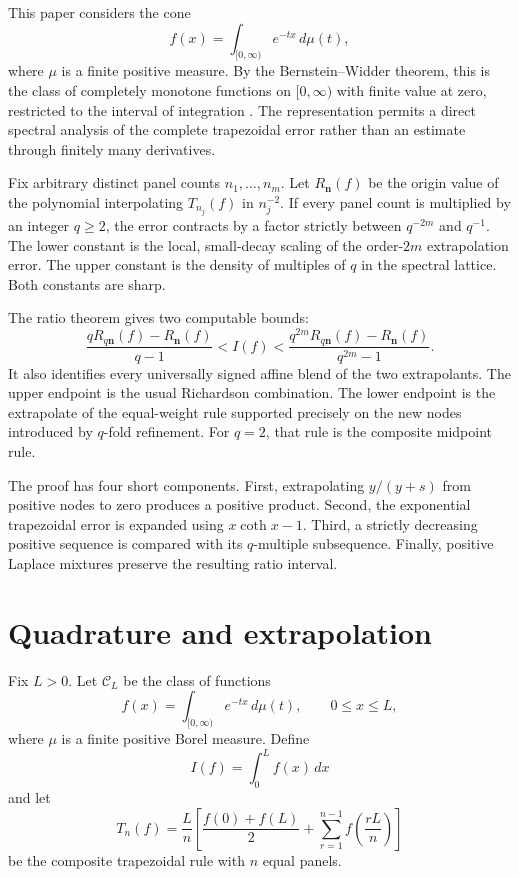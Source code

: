 \documentclass[11pt]{article}
\theoremstyle{definition}
\theoremstyle{remark}
\newcommand{\cC}{\mathcal{C}}
\newcommand{\bN}{\boldsymbol{n}}
\newcommand{\1}{\mathbf{1}}
\begin{document}
This paper considers the cone
\[
f(x)=\int_{[0,\infty)}e^{-tx}\,d\mu(t),
\]
where \(\mu\) is a finite positive measure. By the Bernstein--Widder theorem,
this is the class of completely monotone functions on \([0,\infty)\) with
finite value at zero, restricted to the interval of integration
\cite{Widder,SchillingSongVondracek}. The representation permits a direct
spectral analysis of the complete trapezoidal error rather than an estimate
through finitely many derivatives.

Fix arbitrary distinct panel counts \(n_1,\ldots,n_m\). Let \(R_{\bN}(f)\)
be the origin value of the polynomial interpolating \(T_{n_j}(f)\) in
\(n_j^{-2}\). If every panel count is multiplied by an integer \(q\ge2\), the
error contracts by a factor strictly between \(q^{-2m}\) and \(q^{-1}\).
The lower constant is the local, small-decay scaling of the order-\(2m\)
extrapolation error. The upper constant is the density of multiples of \(q\)
in the spectral lattice. Both constants are sharp.

The ratio theorem gives two computable bounds:
\[
\frac{qR_{q\bN}(f)-R_{\bN}(f)}{q-1}
<
I(f)
<
\frac{q^{2m}R_{q\bN}(f)-R_{\bN}(f)}{q^{2m}-1}.
\]
It also identifies every universally signed affine blend of the two
extrapolants. The upper endpoint is the usual Richardson combination. The
lower endpoint is the extrapolate of the equal-weight rule supported precisely
on the new nodes introduced by \(q\)-fold refinement. For \(q=2\), that rule
is the composite midpoint rule.

The proof has four short components. First, extrapolating
\(y/(y+s)\) from positive nodes to zero produces a positive product. Second,
the exponential trapezoidal error is expanded using \(x\coth x-1\). Third, a
strictly decreasing positive sequence is compared with its \(q\)-multiple
subsequence. Finally, positive Laplace mixtures preserve the resulting ratio
interval.

\section{Quadrature and extrapolation}

Fix \(L>0\). Let \(\cC_L\) be the class of functions
\begin{equation}
f(x)=\int_{[0,\infty)}e^{-tx}\,d\mu(t),
\qquad 0\le x\le L,
\label{eq:laplace-class}
\end{equation}
where \(\mu\) is a finite positive Borel measure. Define
\[
I(f)=\int_0^L f(x)\,dx
\]
and let
\begin{equation}
T_n(f)
=
\frac{L}{n}
\left[
\frac{f(0)+f(L)}{2}
+\sum_{r=1}^{n-1}f\left(\frac{rL}{n}\right)
\right]
\label{eq:trapezoid}
\end{equation}
be the composite trapezoidal rule with \(n\) equal panels.
\end{document}

